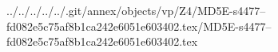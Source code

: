../../../../../.git/annex/objects/vp/Z4/MD5E-s4477--fd082e5c75af8b1ca242e6051e603402.tex/MD5E-s4477--fd082e5c75af8b1ca242e6051e603402.tex